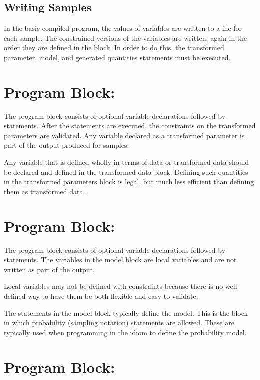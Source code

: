\subsection{Writing Samples}

In the basic \Stan compiled program, the values of variables are
written to a file for each sample.  The constrained versions of the
variables are written, again in the order they are defined in the
 block.  In order to do this, the transformed
parameter, model, and generated quantities statements must be
executed.  


\section{Program Block: }

The  program block consists of optional
variable declarations followed by statements.  After the statements
are executed, the constraints on the transformed parameters are
validated.  Any variable declared as a transformed parameter is part
of the output produced for samples.

Any variable that is defined wholly in terms of data or transformed
data should be declared and defined in the transformed data block.
Defining such quantities in the transformed parameters block is legal,
but much less efficient than defining them as transformed data.

\section{Program Block: }

The  program block consists of optional variable
declarations followed by statements.  The variables in the model block
are local variables and are not written as part of the output.  

Local variables may not be defined with constraints because there is
no well-defined way to have them be both flexible and easy to
validate.

The statements in the model block typically define the model.  This is
the block in which probability (sampling notation) statements are
allowed.  These are typically used when programming in the \BUGS idiom
to define the probability model.  


\section{Program Block: }


